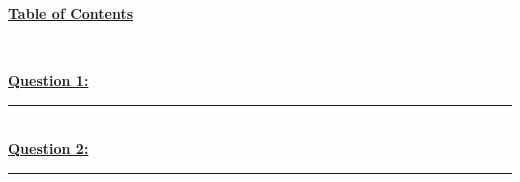 \documentclass[12pt]{article}
\begin{document}
\begin{center}
	\hypertarget{toc}{\LARGE \underline{\textbf{Table of Contents}}}\\
\end{center}

\hyperlink{1}{\textbf{Question 1:}}
\vspace{1mm}
\hrule
\vspace{1mm} \leavevmode \\

\hyperlink{2}{\textbf{Question 2:}}
\vspace{1mm}
\hrule
\vspace{1mm} \leavevmode \\

\newpage
\end{document}
